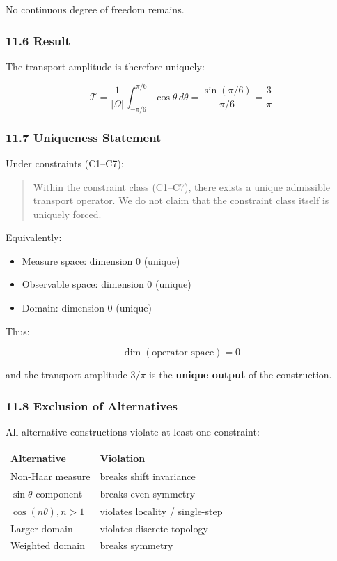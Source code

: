 \documentclass[
]{article}
\providecommand{\tightlist}{%
  \setlength{\itemsep}{0pt}\setlength{\parskip}{0pt}}
\begin{document}
No continuous degree of freedom remains.

\hypertarget{result}{%
\subsubsection{11.6 Result}\label{result}}

The transport amplitude is therefore uniquely:

\[
\mathcal{T} = \frac{1}{|\Omega|} \int_{-\pi/6}^{\pi/6} \cos\theta \, d\theta
= \frac{\sin(\pi/6)}{\pi/6}
= \frac{3}{\pi}
\]

\hypertarget{uniqueness-statement}{%
\subsubsection{11.7 Uniqueness Statement}\label{uniqueness-statement}}

Under constraints (C1--C7):

\begin{quote}
Within the constraint class (C1--C7), there exists a unique admissible
transport operator. We do not claim that the constraint class itself is
uniquely forced.
\end{quote}

Equivalently:

\begin{itemize}
\tightlist
\item
  Measure space: dimension \(0\) (unique)
\item
  Observable space: dimension \(0\) (unique)
\item
  Domain: dimension \(0\) (unique)
\end{itemize}

Thus:

\[
\dim(\text{operator space}) = 0
\]

and the transport amplitude \(3/\pi\) is the \textbf{unique output} of
the construction.

\hypertarget{exclusion-of-alternatives}{%
\subsubsection{11.8 Exclusion of
Alternatives}\label{exclusion-of-alternatives}}

All alternative constructions violate at least one constraint:

\begin{longtable}[]{@{}ll@{}}
\toprule
Alternative & Violation\tabularnewline
\midrule
\endhead
Non-Haar measure & breaks shift invariance\tabularnewline
\(\sin\theta\) component & breaks even symmetry\tabularnewline
\(\cos(n\theta), n>1\) & violates locality / single-step\tabularnewline
Larger domain & violates discrete topology\tabularnewline
Weighted domain & breaks symmetry\tabularnewline
\bottomrule
\end{longtable}
\end{document}
